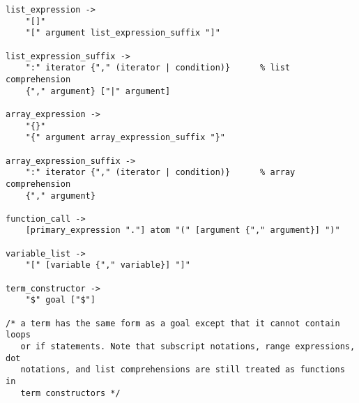 \begin{scriptsize}
\begin{verbatim}
list_expression ->
    "[]"
    "[" argument list_expression_suffix "]"

list_expression_suffix ->
    ":" iterator {"," (iterator | condition)}      % list comprehension
    {"," argument} ["|" argument] 

array_expression ->
    "{}"
    "{" argument array_expression_suffix "}"    

array_expression_suffix ->
    ":" iterator {"," (iterator | condition)}      % array comprehension
    {"," argument} 

function_call ->
    [primary_expression "."] atom "(" [argument {"," argument}] ")"

variable_list ->
    "[" [variable {"," variable}] "]"

term_constructor ->
    "$" goal ["$"]

/* a term has the same form as a goal except that it cannot contain loops 
   or if statements. Note that subscript notations, range expressions, dot
   notations, and list comprehensions are still treated as functions in 
   term constructors */

\end{verbatim}
\end{scriptsize}
\ignore{

}
